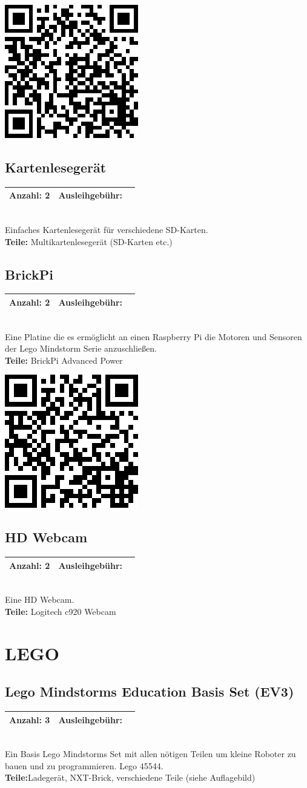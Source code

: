 \documentclass[a4paper]{article}
\newcommand{\infobox}[3] %
        {\par
                \begin{tabular}{| c | c | c| }
                \hline
                Anzahl: #1 & Ausleihgebühr: \EUR{#2}   \\
                \hline
                \end{tabular} \\
        }
\begin{document}
\includegraphics[width=.3\textwidth]{Odroid}

\subsection{Kartenlesegerät}
\infobox{2}{0}{Neu}
Einfaches Kartenlesegerät für verschiedene SD-Karten.\\
\textbf{Teile:} Multikartenlesegerät (SD-Karten etc.)

\subsection{BrickPi}
\infobox{2}{0}{Neu}
Eine Platine die es ermöglicht an einen Raspberry Pi die Motoren und Sensoren der Lego Mindstorm Serie anzuschließen.\\
\textbf{Teile:} BrickPi Advanced Power

\includegraphics[width=.3\textwidth]{BrickiPi}

\subsection{HD Webcam}
\infobox{2}{1,5}{Neu}
Eine HD Webcam. \\ 
\textbf{Teile:} Logitech c920 Webcam

\section{LEGO}

\subsection{Lego Mindstorms Education Basis Set (EV3)}
\infobox{3}{0}{Neu}
Ein Basis Lego Mindstorms Set mit allen nötigen Teilen um kleine Roboter zu bauen und zu programmieren. Lego 45544. \\
\textbf{Teile:}Ladegerät, NXT-Brick, verschiedene Teile (siehe Auflagebild)
\end{document}
